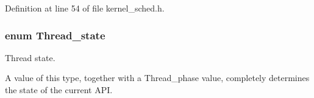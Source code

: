 Definition at line 54 of file kernel\-\_\-sched.\-h.

\hypertarget{group__scheduler_ga6c969c169777f82c104cf73e501df70f}{
\subsubsection[{Thread\-\_\-state}]{\setlength{\rightskip}{0pt plus 5cm}enum {\bf Thread\-\_\-state}}}\label{group__scheduler_ga6c969c169777f82c104cf73e501df70f}


Thread state. 

A value of this type, together with a {\ttfamily Thread\-\_\-phase} value, completely determines the state of the current A\-P\-I.


